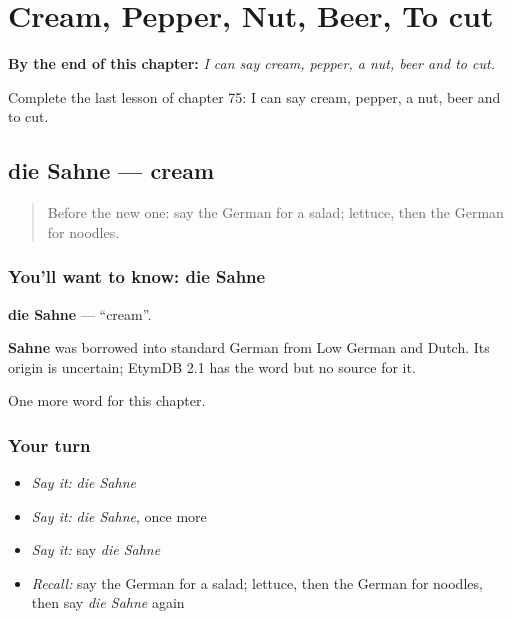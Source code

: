 
\chapter{Cream, Pepper, Nut, Beer, To cut}
\label{ch:ge-cream-pepper-nut-beer-to-cut}

\begin{chapteropening}
\textbf{By the end of this chapter:} \emph{I can say cream, pepper, a nut, beer and to cut.}

Complete the last lesson of chapter 75: I can say cream, pepper, a nut, beer and to cut.
\end{chapteropening}

\section[die Sahne]{die Sahne — cream}

\label{lesson:GE-C75-sahne}



\begin{quote}
Before the new one: say the German for a salad; lettuce, then the German for noodles.
\end{quote}

\subsection*{You'll want to know: die Sahne}
\textbf{die Sahne} — \textquotedblleft{}cream\textquotedblright{}.

\begin{cousinweb}
\textbf{Sahne} was borrowed into standard German from Low German and Dutch. Its origin is uncertain; EtymDB 2.1 has the word but no source for it.
\end{cousinweb}

\begin{grammarlens}[title={What you've built}]
One more word for this chapter.
\end{grammarlens}

\subsection*{Your turn}
\begin{itemize}
\raggedright
  \item \emph{Say it:} \emph{die Sahne}
  \item \emph{Say it:} \emph{die Sahne}, once more
  \item \emph{Say it:} say \emph{die Sahne}
  \item \emph{Recall:} say the German for a salad; lettuce, then the German for noodles, then say \emph{die Sahne} again
\end{itemize}


